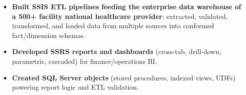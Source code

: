 \documentclass{resume-v2}
\begin{document}
\begin{itemize}
  \item \textbf{Built SSIS ETL pipelines feeding the enterprise data warehouse of a 500+ facility national healthcare provider}: extracted, validated, transformed, and loaded data from multiple sources into conformed fact/dimension schemas.
  \item \textbf{Developed SSRS reports and dashboards} (cross-tab, drill-down, parametric, cascaded) for finance/operations BI.
  \item \textbf{Created SQL Server objects} (stored procedures, indexed views, UDFs) powering report logic and ETL validation.
\end{itemize}

\end{document}
